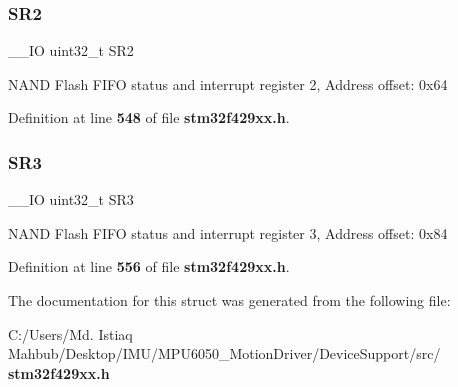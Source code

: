 \subsubsection{S\+R2}
{\footnotesize\ttfamily \+\_\+\+\_\+\+IO uint32\+\_\+t S\+R2}

N\+A\+ND Flash F\+I\+FO status and interrupt register 2, Address offset\+: 0x64 

Definition at line \textbf{ 548} of file \textbf{ stm32f429xx.\+h}.

\mbox{\label{structFMC__Bank2__3__TypeDef_af30c34f7c606cb9416a413ec5fa36491}} 
\subsubsection{S\+R3}
{\footnotesize\ttfamily \+\_\+\+\_\+\+IO uint32\+\_\+t S\+R3}

N\+A\+ND Flash F\+I\+FO status and interrupt register 3, Address offset\+: 0x84 

Definition at line \textbf{ 556} of file \textbf{ stm32f429xx.\+h}.



The documentation for this struct was generated from the following file\+:\begin{DoxyCompactItemize}
\item 
C\+:/\+Users/\+Md. Istiaq Mahbub/\+Desktop/\+I\+M\+U/\+M\+P\+U6050\+\_\+\+Motion\+Driver/\+Device\+Support/src/\textbf{ stm32f429xx.\+h}\end{DoxyCompactItemize}
